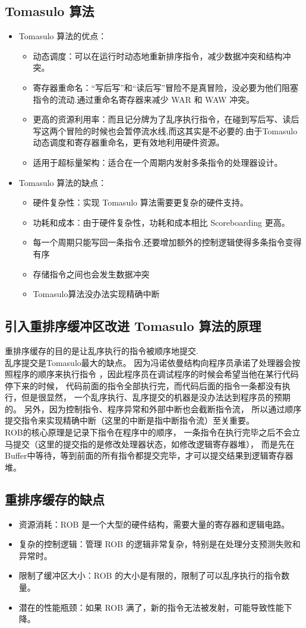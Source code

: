 \documentclass{article}
\begin{document}
\subsection{Tomasulo 算法}
\begin{itemize}
  \item Tomasulo 算法的优点：
  \begin{itemize}
    \item 动态调度：可以在运行时动态地重新排序指令，减少数据冲突和结构冲突。
    \item 寄存器重命名：“写后写”和“读后写”冒险不是真冒险，没必要为他们阻塞指令的流动.通过重命名寄存器来减少 WAR 和 WAW 冲突。
    \item 更高的资源利用率：而且记分牌为了乱序执行指令，在碰到写后写、读后写这两个冒险的时候也会暂停流水线,而这其实是不必要的.由于Tomasulo动态调度和寄存器重命名，更有效地利用硬件资源。
    \item 适用于超标量架构：适合在一个周期内发射多条指令的处理器设计。
  \end{itemize}
  \item Tomasulo 算法的缺点：
  \begin{itemize}
    \item 硬件复杂性：实现 Tomasulo 算法需要更复杂的硬件支持。
    \item 功耗和成本：由于硬件复杂性，功耗和成本相比 Scoreboarding 更高。
    \item 每一个周期只能写回一条指令,还要增加额外的控制逻辑使得多条指令变得有序
    \item 存储指令之间也会发生数据冲突
    \item Tomasulo算法没办法实现精确中断
  \end{itemize}
\end{itemize}

\subsection{引入重排序缓冲区改进 Tomasulo 算法的原理}
重排序缓存的目的是让乱序执行的指令被顺序地提交.\\乱序提交是Tomasulo最大的缺点。
因为冯诺依曼结构向程序员承诺了处理器会按照程序的顺序来执行指令
，因此程序员在调试程序的时候会希望当他在某行代码停下来的时候，
代码前面的指令全部执行完，而代码后面的指令一条都没有执行，但是很显然，
一个乱序执行、乱序提交的机器是没办法达到程序员的预期的。
另外，因为控制指令、程序异常和外部中断也会截断指令流，
所以通过顺序提交指令来实现精确中断（这里的中断是指中断指令流）至关重要。\\
ROB的核心原理是记录下指令在程序中的顺序，
一条指令在执行完毕之后不会立马提交（这里的提交指的是修改处理器状态，如修改逻辑寄存器堆），
而是先在Buffer中等待，等到前面的所有指令都提交完毕，才可以提交结果到逻辑寄存器堆。

\subsection{重排序缓存的缺点}
\begin{itemize}
  \item 资源消耗：ROB 是一个大型的硬件结构，需要大量的寄存器和逻辑电路。
  \item 复杂的控制逻辑：管理 ROB 的逻辑非常复杂，特别是在处理分支预测失败和异常时。
  \item 限制了缓冲区大小：ROB 的大小是有限的，限制了可以乱序执行的指令数量。
  \item 潜在的性能瓶颈：如果 ROB 满了，新的指令无法被发射，可能导致性能下降。
\end{itemize}
\end{document}
